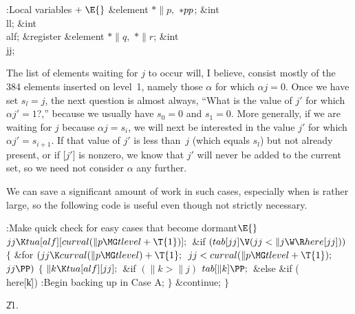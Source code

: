 \B{}:Local variables\X${}\mathrel+\E{}$\6
\&{element} ${}{*}\|p,{}$ ${}{*}\\{pp}{}$;\6
\&{int} \\{ll};\6
\&{int} \\{alf};\6
\&{register} \&{element} ${}{*}\|q,{}$ ${}{*}\|r{}$;\6
\&{int} \\{jj};\par
\fi

The list of elements waiting for $j$ to occur will, I
believe, consist
mostly of the 384 elements inserted on level~1, namely those $\alpha$ for which
$\alpha j=0$. Once we have set $s_l=j$, the next question is almost
always, ``What is the value of $j'$ for which $\alpha j'=1$?,'' because
we usually have $s_0=0$ and $s_1=0$. More generally, if we are waiting
for $j$ because $\alpha j=s_i$, we will next be interested in the
value $j'$ for which $\alpha j'=s_{i+1}$. If that value of $j'$ is
less than~$j$ (which equals $s_l$) but not already present,
or if [$j'$] is nonzero,
we know that $j'$ will never be added to the current set, so we need not
consider $\alpha$ any further.

We can save a significant amount of work in such cases,
especially when  is rather large, so the following code is
useful even though not strictly necessary.

\Y\B\4:Make quick check for easy cases that become dormant\X${}\E{}$\6
$\\{jj}\K\\{tua}[\\{alf}][\\{curval}(\|p\MG\\{tlevel}+\T{1})];{}$\6
\&{if} ${}(\\{tab}[\\{jj}]\V(\\{jj}<\|j\W\R\\{here}[\\{jj}])){}$\5
${}\{{}$\1\6
\&{for} ${}(\\{jj}\K\\{curval}(\|p\MG\\{tlevel})+\T{1};{}$ ${}\\{jj}<%
\\{curval}(\|p\MG\\{tlevel}+\T{1});{}$ ${}\\{jj}\PP){}$\5
${}\{{}$\1\6
${}\|k\K\\{tua}[\\{alf}][\\{jj}];{}$\6
\&{if} ${}(\|k>\|j){}$\1\5
${}\\{tab}[\|k]\PP;{}$\2\6
\&{else} \&{if} (\\{here}[\|k])\1\5
:Begin backing up in Case A\X;\2\6
\4${}\}{}$\2\6
\&{continue};\6
\4${}\}{}$\2\par
\U21.\fi

